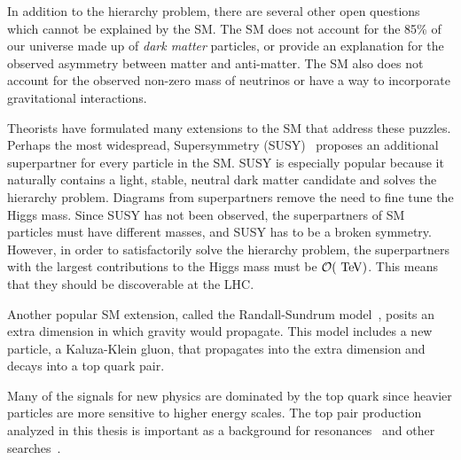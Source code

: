 In addition to the hierarchy problem, there are several other open questions which cannot be explained by the SM. The SM does not account for the 85\% of our universe made up of \textit{dark matter} particles, or provide an explanation for the observed asymmetry between matter and anti-matter. The SM also does not account for the observed non-zero mass of neutrinos or have a way to incorporate gravitational interactions.

Theorists have formulated many extensions to the SM that address these puzzles. Perhaps the most widespread, Supersymmetry (SUSY)~\cite{susy} proposes an additional superpartner for every particle in the SM. SUSY is especially popular because it naturally contains a light, stable, neutral dark matter candidate and solves the hierarchy problem. Diagrams from superpartners remove the need to fine tune the Higgs mass. Since SUSY has not been observed, the superpartners of SM particles must have different masses, and SUSY has to be a broken symmetry. However, in order to satisfactorily solve the hierarchy problem, the superpartners with the largest contributions to the Higgs mass must be $\mathcal{O}(\tev)$. This means that they should be discoverable at the LHC.

Another popular SM extension, called the Randall-Sundrum model~\cite{Lillie:2007yh}, posits an extra dimension in which gravity would propagate. This model includes a new particle, a Kaluza-Klein gluon, that propagates into the extra dimension and decays into a top quark pair.

Many of the signals for new physics are dominated by the top quark since heavier particles are more sensitive to higher energy scales.  The top pair production analyzed in this thesis is important as a background for \ttbar resonances~\cite{ATLAS-CONF-2015-009} and other searches~\cite{Aad:2014kra}.




